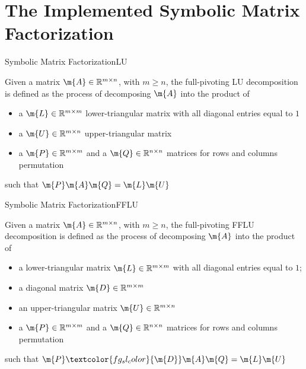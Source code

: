 
\section{The Implemented Symbolic Matrix Factorization}

\begin{frame}{Symbolic Matrix Factorization}{\acf{LU}}
  \begin{bbox}
    Given a matrix $\m{A} \in \mathbb{R}^{m \times n}$, with $m \geq n$, the full-pivoting \acs{LU} decomposition is defined as the process of decomposing $\m{A}$ into the product of
    \begin{itemize}
      \item a $\m{L} \in \mathbb{R}^{m \times m}$ lower-triangular matrix with all diagonal entries equal to $1$
      \item a $\m{U} \in \mathbb{R}^{m \times n}$ upper-triangular matrix
      \item a $\m{P} \in \mathbb{R}^{m \times m}$ and a $\m{Q} \in \mathbb{R}^{n \times n}$ matrices for rows and columns permutation
    \end{itemize}
    such that $\m{P}\m{A}\m{Q} = \m{L}\m{U}$
  \end{bbox}
\end{frame}

\begin{frame}{Symbolic Matrix Factorization}{\acf{FFLU}}
  \begin{bbox}
    Given a matrix $\m{A} \in \mathbb{R}^{m \times n}$, with $m \geq n$, the full-pivoting \acs{FFLU} decomposition is defined as the process of decomposing $\m{A}$ into the product of
    \begin{itemize}
      \item a lower-triangular matrix $\m{L} \in \mathbb{R}^{m \times m}$ with all diagonal entries equal to $1$;
      \item \textcolor{fg_sl_color}{a diagonal matrix $\m{D} \in \mathbb{R}^{m \times m}$}
      \item an upper-triangular matrix $\m{U} \in \mathbb{R}^{m \times n}$
      \item a $\m{P} \in \mathbb{R}^{m \times m}$ and a $\m{Q} \in \mathbb{R}^{n \times n}$ matrices for rows and columns permutation
    \end{itemize}
    such that $\m{P}\textcolor{fg_sl_color}{\m{D}}\m{A}\m{Q} = \m{L}\m{U}$
  \end{bbox}
\end{frame}


